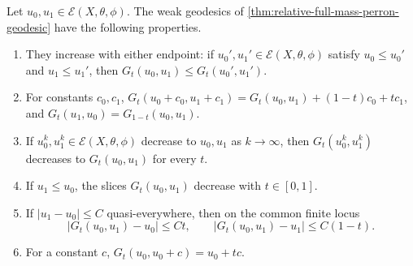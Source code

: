 \begin{proposition}\label{prop:perron-geodesic-order-and-limits}
Let $u_0,u_1\in\mathcal E(X,\theta,\phi)$. The weak geodesics of \cref{thm:relative-full-mass-perron-geodesic} have the following properties.
\begin{enumerate}
 \item They increase with either endpoint: if $u_0',u_1'\in\mathcal E(X,\theta,\phi)$ satisfy $u_0\leq u_0'$ and $u_1\leq u_1'$, then $G_t(u_0,u_1)\leq G_t(u_0',u_1')$.
 \item For constants $c_0,c_1$, $G_t(u_0+c_0,u_1+c_1)=G_t(u_0,u_1)+(1-t)c_0+tc_1$, and $G_t(u_1,u_0)=G_{1-t}(u_0,u_1)$.
 \item If $u_0^k,u_1^k\in\mathcal E(X,\theta,\phi)$ decrease to $u_0,u_1$ as $k\to\infty$, then $G_t(u_0^k,u_1^k)$ decreases to $G_t(u_0,u_1)$ for every $t$.
 \item If $u_1\leq u_0$, the slices $G_t(u_0,u_1)$ decrease with $t\in[0,1]$.
 \item If $|u_1-u_0|\leq C$ quasi-everywhere, then on the common finite locus
\[
 |G_t(u_0,u_1)-u_0|\leq Ct,\qquad
 |G_t(u_0,u_1)-u_1|\leq C(1-t).
\]
 \item For a constant $c$, $G_t(u_0,u_0+c)=u_0+tc$.
\end{enumerate}
\end{proposition}
